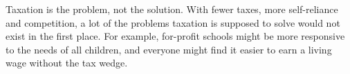 Taxation is the problem, not the solution.
With fewer taxes, more self-reliance and competition, a lot of the problems taxation is supposed to solve would not exist in the first place.
For example, for-profit schools might be more responsive to the needs of all children, and everyone might find it easier to earn a living wage without the tax wedge.
